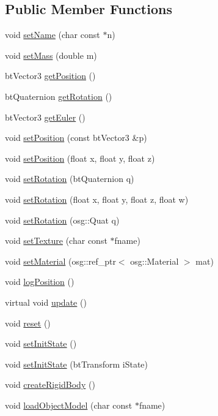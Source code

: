 \subsection*{Public Member Functions}
\begin{DoxyCompactItemize}
\item 
void \hyperlink{classbtosgObject_ab06a1b3f357209214c6440cd5746523e}{set\+Name} (char const $\ast$n)
\item 
void \hyperlink{classbtosgObject_a91da93c82d48b86192f0cbb16054fe57}{set\+Mass} (double m)
\item 
bt\+Vector3 \hyperlink{classbtosgObject_a77a1434498d7a6d00c415042a995d119}{get\+Position} ()
\item 
bt\+Quaternion \hyperlink{classbtosgObject_a9cadb03762699412552601196950a039}{get\+Rotation} ()
\item 
bt\+Vector3 \hyperlink{classbtosgObject_afef1fe06635566ab9cee134f72439e02}{get\+Euler} ()
\item 
void \hyperlink{classbtosgObject_ad0f76df8e8bde6c8a9d1b1d53551172b}{set\+Position} (const bt\+Vector3 \&p)
\item 
void \hyperlink{classbtosgObject_adb9f2cff0faf66dc252cd7c97b11ac84}{set\+Position} (float x, float y, float z)
\item 
void \hyperlink{classbtosgObject_a656412794a971a10478aedb520f298bf}{set\+Rotation} (bt\+Quaternion q)
\item 
void \hyperlink{classbtosgObject_a4d21ca59b944fd26644db35d3e9ba67a}{set\+Rotation} (float x, float y, float z, float w)
\item 
void \hyperlink{classbtosgObject_ae803e0566f0d7b3ffca686b968b297f8}{set\+Rotation} (osg\+::\+Quat q)
\item 
void \hyperlink{classbtosgObject_aff54acbc7c66811efb0cf2838107a241}{set\+Texture} (char const $\ast$fname)
\item 
void \hyperlink{classbtosgObject_a6ab7b9e0553dab398b980637788b56a8}{set\+Material} (osg\+::ref\+\_\+ptr$<$ osg\+::\+Material $>$ mat)
\item 
void \hyperlink{classbtosgObject_acfd70fa6477c80fd7f29ad7ab9f4f067}{log\+Position} ()
\item 
virtual void \hyperlink{classbtosgObject_a342917817dfde62554f83da8e0d5110b}{update} ()
\item 
void \hyperlink{classbtosgObject_a93983f9180dd0672f8779cf2baa78580}{reset} ()
\item 
void \hyperlink{classbtosgObject_ad1508a0ce28cfac83e5f0ff6245f91b5}{set\+Init\+State} ()
\item 
void \hyperlink{classbtosgObject_a6ceb08e59ee95acaaef389ee198d2b56}{set\+Init\+State} (bt\+Transform i\+State)
\item 
void \hyperlink{classbtosgObject_a029dbe9134fa94e7355799f67fb2cd6d}{create\+Rigid\+Body} ()
\item 
void \hyperlink{classbtosgObject_a91838b8235579da178fcc06e6d3d47f3}{load\+Object\+Model} (char const $\ast$fname)
\end{DoxyCompactItemize}
